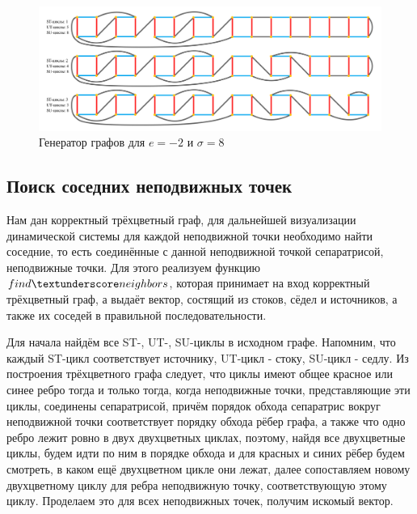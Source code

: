 	\begin{figure}[h!]
	\centering
	\includegraphics[width=\textwidth]{Double Torus.png}
	\caption{Генератор графов для $e=-2$ и $\sigma=8$ \label{overflow}}
	\end{figure}
	\subsection{Поиск соседних неподвижных точек}
	\hspace{0.5 cm} Нам дан корректный трёхцветный граф, для дальнейшей визуализации динамической системы для каждой неподвижной точки необходимо найти соседние, то есть соединённые с данной неподвижной точкой сепаратрисой, неподвижные точки. Для этого реализуем функцию $find \textunderscore neighbors$, которая принимает на вход корректный трёхцветный граф, а выдаёт вектор, состящий из стоков, сёдел и источников, а также их соседей в правильной последовательности.
	\par Для начала найдём все ST-, UT-, SU-циклы в исходном графе. Напомним, что каждый ST-цикл соответствует источнику, UT-цикл - стоку, SU-цикл - седлу. Из построения трёхцветного графа следует, что циклы имеют общее красное или синее ребро тогда и только тогда, когда неподвижные точки, представляющие эти циклы, соединены сепаратрисой, причём порядок обхода сепаратрис вокруг неподвижной точки соответствует порядку обхода рёбер графа, а также что одно ребро лежит ровно в двух двухцветных циклах, поэтому, найдя все двухцветные циклы, будем идти по ним в порядке обхода и для красных и синих рёбер будем смотреть, в каком ещё двухцветном цикле они лежат, далее сопоставляем новому двухцветному циклу для ребра неподвижную точку, соответствующую этому циклу. Проделаем это для всех неподвижных точек, получим искомый вектор.
